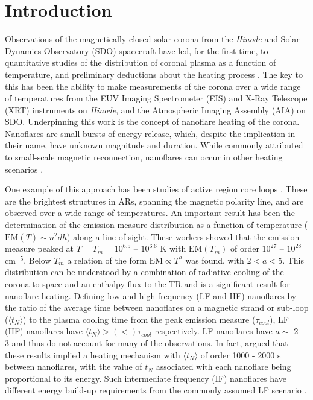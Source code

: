 \documentclass[apj]{emulateapj}
\begin{document}
	\section{Introduction}
	\label{sec:intro}
	\par Observations of the magnetically closed solar corona from the \textit{Hinode} \citep{kosugi_hinode_2007} and Solar Dynamics Observatory (SDO) \citep{pesnell_solar_2012} spacecraft have led, for the first time, to quantitative studies of the distribution of coronal plasma as a function of temperature, and preliminary deductions about the heating process \citep[see papers in][]{de_moortel_recent_2015}. The key to this has been the ability to make measurements of the corona over a wide range of temperatures from the EUV Imaging Spectrometer (EIS) \citep{culhane_euv_2007} and X-Ray Telescope (XRT) \citep{golub_x-ray_2007} instruments on \textit{Hinode}, and the Atmospheric Imaging Assembly (AIA) \citep{lemen_atmospheric_2012} on SDO. Underpinning this work is the concept of nanoflare heating of the corona. Nanoflares \citep[e.g.][]{parker_nanoflares_1988} are small bursts of energy release, which, despite the implication in their name, have unknown magnitude and duration. While commonly attributed to small-scale magnetic reconnection, nanoflares can occur in other heating scenarios \citep[e.g.][]{ofman_self-consistent_1998}.
%
	\par One example of this approach has been studies of active region core loops \citep{warren_constraints_2011,warren_systematic_2012,winebarger_using_2011,tripathi_emission_2011,schmelz_cold_2012,bradshaw_diagnosing_2012,reep_diagnosing_2013,del_zanna_evolution_2015}. These are the brightest structures in ARs, spanning the magnetic polarity line, and are observed over a wide range of temperatures. An important result has been the determination of the emission measure distribution as a function of temperature ($\mathrm{EM}(T)\sim n^2dh$) along a line of sight. These workers showed that the emission measure peaked at $T = T_m = 10^{6.5}$ – $10^{6.6}$ K with $\mathrm{EM}(T_m)$ of order $10^{27}$ – $10^{28}$ cm$^{-5}$.  Below $T_m$ a relation of the form $\mathrm{EM} \propto T^a$ was found, with $2 < a < 5$. This distribution can be understood by a combination of radiative cooling of the corona to space and an enthalpy flux to the TR \citep[e.g.][]{bradshaw_cooling_2010,bradshaw_new_2010} and is a significant result for nanoflare heating. Defining low and high frequency (LF and HF) nanoflares by the ratio of the average time between nanoflares on a magnetic strand or sub-loop ($\langle t_N \rangle$) to the plasma cooling time from the peak emission measure ($\tau_{cool}$), LF (HF) nanoflares have $\langle t_N \rangle > (<) \tau_{cool}$ respectively. LF nanoflares have $a \sim$ 2 - 3 and thus do not account for many of the observations. In fact, \citet{cargill_active_2014} argued that these results implied a heating mechanism with $\langle t_N \rangle$ of order 1000 - 2000 s between nanoflares, with the value of $t_N$ associated with each nanoflare being proportional to its energy. Such intermediate frequency (IF) nanoflares have different energy build-up requirements from the commonly assumed LF scenario \citep{cargill_active_2014}.  
\end{document}
